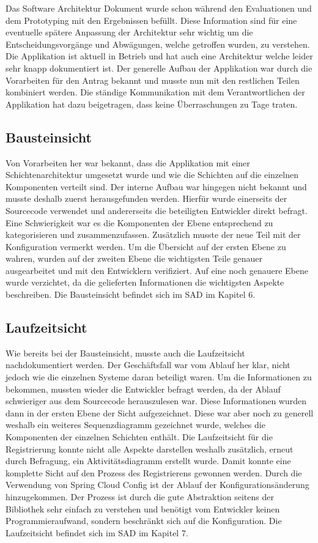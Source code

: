 Das Software Architektur Dokument wurde schon während den Evaluationen und dem Prototyping mit den Ergebnissen befüllt. Diese Information sind für eine eventuelle spätere Anpassung der Architektur sehr wichtig um die Entscheidungsvorgänge und Abwägungen, welche getroffen wurden, zu verstehen. Die Applikation ist aktuell in Betrieb und hat auch eine Architektur welche leider sehr knapp dokumentiert ist. Der generelle Aufbau der Applikation war durch die Vorarbeiten für den Antrag bekannt und musste nun mit den restlichen Teilen kombiniert werden. Die ständige Kommunikation mit dem Verantwortlichen der Applikation hat dazu beigetragen, dass keine Überraschungen zu Tage traten.

\subsection{Bausteinsicht}

Von Vorarbeiten her war bekannt, dass die Applikation mit einer Schichtenarchitektur umgesetzt wurde und wie die Schichten auf die einzelnen Komponenten verteilt sind. Der interne Aufbau war hingegen nicht bekannt und musste deshalb zuerst herausgefunden werden. Hierfür wurde einerseits der Sourcecode verwendet und andererseits die beteiligten Entwickler direkt befragt. Eine Schwierigkeit war es die Komponenten der Ebene entsprechend zu kategorisieren und zusammenzufassen. Zusätzlich musste der neue Teil mit der Konfiguration vermerkt werden. Um die Übersicht auf der ersten Ebene zu wahren, wurden auf der zweiten Ebene die wichtigsten Teile genauer ausgearbeitet und mit den Entwicklern verifiziert. Auf eine noch genauere Ebene wurde verzichtet, da die gelieferten Informationen die wichtigsten Aspekte beschreiben. Die Bausteinsicht befindet sich im SAD im Kapitel 6.

\subsection{Laufzeitsicht}

Wie bereits bei der Bausteinsicht, musste auch die Laufzeitsicht nachdokumentiert werden. Der Geschäftsfall war vom Ablauf her klar, nicht jedoch wie die einzelnen Systeme daran beteiligt waren. Um die Informationen zu bekommen, mussten wieder die Entwickler befragt werden, da der Ablauf schwieriger aus dem Sourcecode herauszulesen war. Diese Informationen wurden dann in der ersten Ebene der Sicht aufgezeichnet. Diese war aber noch zu generell weshalb ein weiteres Sequenzdiagramm gezeichnet wurde, welches die Komponenten der einzelnen Schichten enthält. Die Laufzeitsicht für die Registrierung konnte nicht alle Aspekte darstellen weshalb zusätzlich, erneut durch Befragung, ein Aktivitätsdiagramm erstellt wurde. Damit konnte eine komplette Sicht auf den Prozess des Registrierens gewonnen werden.\newline\newline
Durch die Verwendung von Spring Cloud Config ist der Ablauf der Konfigurationsänderung hinzugekommen. Der Prozess ist durch die gute Abstraktion seitens der Bibliothek sehr einfach zu verstehen und benötigt vom Entwickler keinen Programmieraufwand, sondern beschränkt sich auf die Konfiguration. Die Laufzeitsicht befindet sich im SAD im Kapitel 7.


